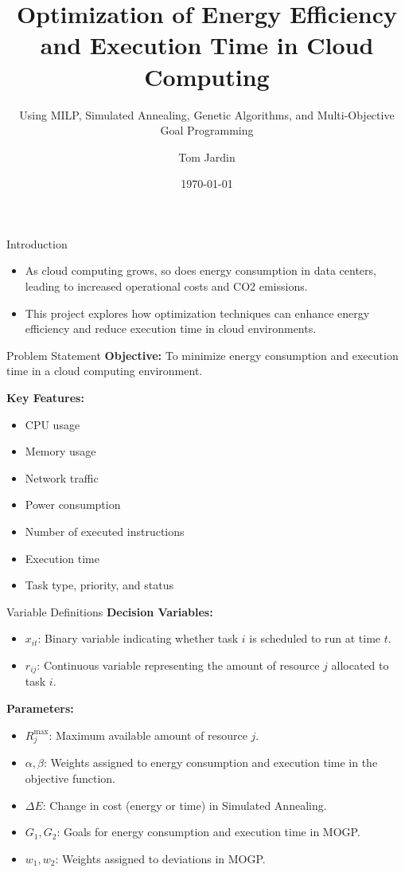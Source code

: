 \documentclass{beamer}
\title{Optimization of Energy Efficiency and Execution Time in Cloud Computing}
\subtitle{Using MILP, Simulated Annealing, Genetic Algorithms, and Multi-Objective Goal Programming}
\author{Tom Jardin}
\date{\today}
\begin{document}
\frame{\titlepage}

\begin{frame}{Introduction}
    \begin{itemize}
        \item As cloud computing grows, so does energy consumption in data centers, leading to increased operational costs and CO2 emissions.
        \item This project explores how optimization techniques can enhance energy efficiency and reduce execution time in cloud environments.
    \end{itemize}
\end{frame}

\begin{frame}{Problem Statement}
    \textbf{Objective:} To minimize energy consumption and execution time in a cloud computing environment.
    
    \textbf{Key Features:}
    \begin{itemize}
        \item CPU usage
        \item Memory usage
        \item Network traffic
        \item Power consumption
        \item Number of executed instructions
        \item Execution time
        \item Task type, priority, and status
    \end{itemize}
\end{frame}

\begin{frame}{Variable Definitions}
    \textbf{Decision Variables:}
    \begin{itemize}
        \item \(x_{it}\): Binary variable indicating whether task \(i\) is scheduled to run at time \(t\).
        \item \(r_{ij}\): Continuous variable representing the amount of resource \(j\) allocated to task \(i\).
    \end{itemize}

    \textbf{Parameters:}
    \begin{itemize}
        \item \(R_j^{\text{max}}\): Maximum available amount of resource \(j\).
        \item \(\alpha, \beta\): Weights assigned to energy consumption and execution time in the objective function.
        \item \(\Delta E\): Change in cost (energy or time) in Simulated Annealing.
        \item \(G_1, G_2\): Goals for energy consumption and execution time in MOGP.
        \item \(w_1, w_2\): Weights assigned to deviations in MOGP.
    \end{itemize}
\end{frame}
\end{document}
